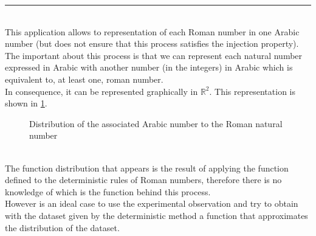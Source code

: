 \documentclass[a4paper, 11pt]{article}
\begin{document}
\rule{\linewidth}{0.4pt}\\
This application allows to representation of each Roman number in one Arabic number (but does not ensure that this process satisfies the injection property).\\
The important about this process is that we can represent each natural number expressed in Arabic with another number (in the integers) in Arabic which is equivalent to, at least one, roman number.\\
In consequence, it can be represented graphically in $\mathbb{R}^2$. This representation is shown in \ref{romans}.
\begin{figure}[h]
    \centering
    \caption{Distribution of the associated Arabic number to the Roman natural number}
    \label{romans}
\end{figure}\\
The function distribution that appears is the result of applying the function defined to the deterministic rules of Roman numbers, therefore there is no knowledge of which is the function behind this process.\\
However is an ideal case to use the experimental observation and try to obtain with the dataset given by the deterministic method a function that approximates the distribution of the dataset.
\end{document}
